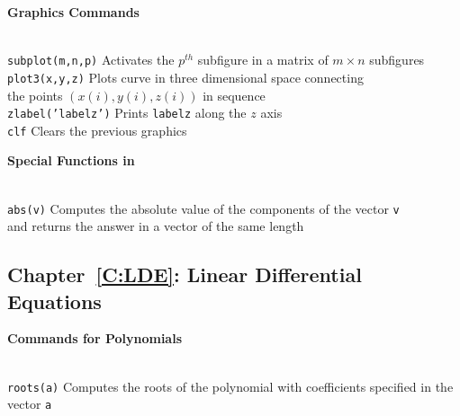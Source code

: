 \documentclass{ximera}
\begin{document}
\centerline{
{\bf Graphics Commands}
} \vspace*{-0.1in}
 
\begin{tabbing}
 \hspace{1.4in} \= \\

     {\tt subplot(m,n,p)}   \>
 Activates the $p^{th}$ subfigure in a matrix of $m\times n$
	subfigures   \\
 
     {\tt plot3(x,y,z)}   \>
 Plots curve in three dimensional space connecting \\ 
	\> the points $(x(i),y(i),z(i))$ in sequence   \\

	{\tt zlabel('labelz')}   \>
 Prints {\tt labelz} along the $z$ axis   \\

     {\tt clf}   \>
 Clears the previous graphics   

\end{tabbing}

\centerline{
{\bf Special Functions in \Matlab}
} \vspace*{-0.1in}
 
\begin{tabbing}
 \hspace{1.2in} \= \\

     {\tt abs(v)}   \>
 Computes the absolute value of the components of the vector {\tt v}\\
	\> and returns the answer in a vector of the same length

\end{tabbing}


\subsection*{Chapter~\ref{C:LDE}: Linear Differential Equations}



\centerline{
{\bf Commands for Polynomials}
} \vspace*{-0.1in}
 
\begin{tabbing}
 \hspace{1.1in} \= \\

     {\tt roots(a)}   \>
 Computes the roots of the polynomial with coefficients
			specified in the vector {\tt a}  

\end{tabbing}
\end{document}
